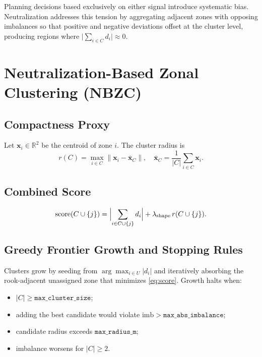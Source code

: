 \documentclass[conference]{IEEEtran}
\begin{document}
Planning decisions based exclusively on either signal introduce
systematic bias.
Neutralization addresses this tension by aggregating adjacent zones
with opposing imbalances so that positive and negative deviations
offset at the cluster level, producing regions where
$\bigl|\sum_{i\in C} d_i\bigr|\approx 0$.

\section{Neutralization-Based Zonal Clustering (NBZC)}

\subsection{Compactness Proxy}
Let $\mathbf{x}_i\in\mathbb{R}^2$ be the centroid of zone $i$.
The cluster radius is
\begin{equation}
r(C) = \max_{i\in C}\|\mathbf{x}_i - \bar{\mathbf{x}}_C\|,
\quad
\bar{\mathbf{x}}_C = \frac{1}{|C|}\sum_{i\in C}\mathbf{x}_i.
\end{equation}

\subsection{Combined Score}
\begin{equation}
\mathrm{score}(C\cup\{j\}) =
\Bigl|\sum_{i\in C\cup\{j\}} d_i\Bigr|
+ \lambda_{\mathrm{shape}}\,r(C\cup\{j\}).
\label{eq:score}
\end{equation}

\subsection{Greedy Frontier Growth and Stopping Rules}
Clusters grow by seeding from $\arg\max_{i\in U}|d_i|$ and
iteratively absorbing the rook-adjacent unassigned zone that minimizes
\eqref{eq:score}.
Growth halts when:
\begin{itemize}
  \item $|C|\ge\texttt{max\_cluster\_size}$;
  \item adding the best candidate would violate
        $\mathrm{imb}>\texttt{max\_abs\_imbalance}$;
  \item candidate radius exceeds $\texttt{max\_radius\_m}$;
  \item imbalance worsens for $|C|\ge2$.
\end{itemize}
\end{document}
